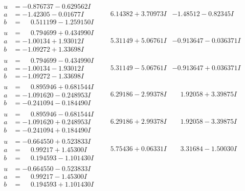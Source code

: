 \documentclass[1p]{elsarticle_modified}
\theoremstyle{definition}
\begin{document}
$$\begin{array}{c|c|c}
\begin{aligned}
u &= -0.876737 - 0.629562 I \\
a &= -1.42305 - 0.01677 I \\
b &= \phantom{-}0.511199 - 1.259150 I\end{aligned}
 & \phantom{-}6.14382 + 3.70973 I & -1.48512 - 0.82345 I \\ \hline\begin{aligned}
u &= \phantom{-}0.794699 + 0.434990 I \\
a &= -1.00134 + 1.93012 I \\
b &= -1.09272 + 1.33698 I\end{aligned}
 & \phantom{-}5.31149 + 5.06761 I & -0.913647 - 0.036371 I \\ \hline\begin{aligned}
u &= \phantom{-}0.794699 - 0.434990 I \\
a &= -1.00134 - 1.93012 I \\
b &= -1.09272 - 1.33698 I\end{aligned}
 & \phantom{-}5.31149 - 5.06761 I & -0.913647 + 0.036371 I \\ \hline\begin{aligned}
u &= \phantom{-}0.895946 + 0.681544 I \\
a &= -1.091620 - 0.248953 I \\
b &= -0.241094 - 0.184490 I\end{aligned}
 & \phantom{-}6.29186 - 2.99378 I & \phantom{-}1.92058 + 3.39875 I \\ \hline\begin{aligned}
u &= \phantom{-}0.895946 - 0.681544 I \\
a &= -1.091620 + 0.248953 I \\
b &= -0.241094 + 0.184490 I\end{aligned}
 & \phantom{-}6.29186 + 2.99378 I & \phantom{-}1.92058 - 3.39875 I \\ \hline\begin{aligned}
u &= -0.664550 + 0.523833 I \\
a &= \phantom{-}0.99217 + 1.45300 I \\
b &= \phantom{-}0.194593 - 1.101430 I\end{aligned}
 & \phantom{-}5.75436 + 0.06331 I & \phantom{-}3.31684 - 1.50030 I \\ \hline\begin{aligned}
u &= -0.664550 - 0.523833 I \\
a &= \phantom{-}0.99217 - 1.45300 I \\
b &= \phantom{-}0.194593 + 1.101430 I\end{aligned}

\end{array}$$
\end{document}
